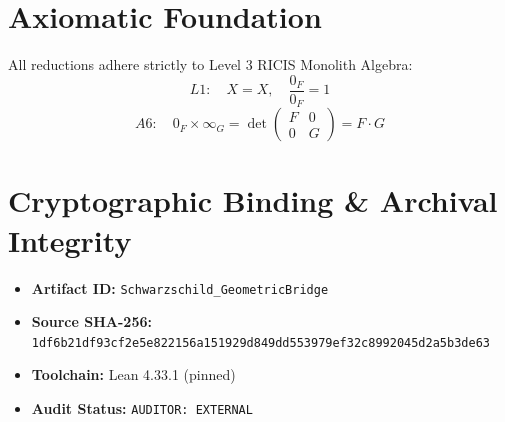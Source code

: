 \documentclass[11pt,a4paper]{article}
\begin{document}
\section{Axiomatic Foundation}
All reductions adhere strictly to Level 3 RICIS Monolith Algebra:
\begin{equation}
L1: \quad X = X, \quad \frac{0_F}{0_F} = 1
\end{equation}
\begin{equation}
A6: \quad 0_F \times \infty_G = \det\begin{pmatrix} F & 0 \\ 0 & G \end{pmatrix} = F \cdot G
\end{equation}

\section{Cryptographic Binding & Archival Integrity}
\begin{itemize}
  \item \textbf{Artifact ID:} \texttt{Schwarzschild_GeometricBridge}
  \item \textbf{Source SHA-256:} \texttt{1df6b21df93cf2e5e822156a151929d849dd553979ef32c8992045d2a5b3de63}
  \item \textbf{Toolchain:} Lean 4.33.1 (pinned)
  \item \textbf{Audit Status:} \texttt{AUDITOR: EXTERNAL}
\end{itemize}
\end{document}
